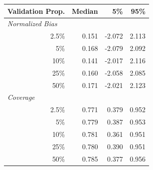 
\begin{tabular}{r|rrr}
\toprule
Validation Prop. & Median & 5\% & 95\%\\
\midrule
\multicolumn{1}{l|}{\textit{Normalized Bias}}\\
2.5\% & 0.151 & -2.072 & 2.113\\
5\% & 0.168 & -2.079 & 2.092\\
10\% & 0.141 & -2.017 & 2.116\\
25\% & 0.160 & -2.058 & 2.085\\
50\% & 0.171 & -2.021 & 2.123\\
\midrule
%
\multicolumn{1}{l|}{\textit{Coverage}}\\
2.5\% & 0.771 & 0.379 & 0.952\\
5\% & 0.779 & 0.387 & 0.953\\
10\% & 0.781 & 0.361 & 0.951\\
25\% & 0.780 & 0.390 & 0.951\\
50\% & 0.785 & 0.377 & 0.956\\
\bottomrule
\end{tabular}
